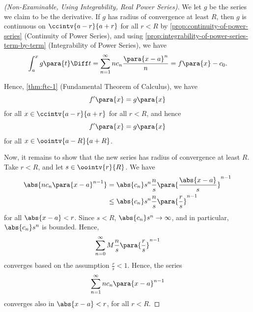 \begin{proof}[(Non-Examinable, Using Integrability, Real Power Series)]
    We let \(g\) be the series we claim to be the derivative. If \(g\) has radius of convergence at least \(R\), then \(g\) is continuous on \(\ccintv{a - r}{a + r}\) for all \(r < R\) by \autoref{prop:continuity-of-power-series} (Continuity of Power Series), and using \autoref{prop:integrability-of-power-series-term-by-term} (Integrability of Power Series), we have
    \[
        \int_{a}^{x} g\para{t} \Diff t = \sum_{n = 1}^{\infty} n c_n \frac{\para{x - a}^{n}}{n} = f\para{x} - c_0.
    \]

    Hence, \autoref{thm:ftc-1} (Fundamental Theorem of Calculus), we have
    \[
        f'\para{x} = g\para{x}
    \]
    for all \(x \in \ccintv{a - r}{a + r}\) for all \(r < R\), and hence
    \[
        f'\para{x} = g\para{x}
    \]
    for all \(x \in \oointv{a - R}{a + R}\).

    Now, it remains to show that the new series has radius of convergence at least \(R\). Take \(r < R\), and let \(s \in \oointv{r}{R}\). We have
    \begin{align*}
        \abs{n c_n \para{x - a}^{n - 1}} &= \abs{c_n} s^n \frac{n}{s} \para{\frac{\abs{x - a}}{s}}^{n - 1} \\
        &\leq \abs{c_n} s^n \frac{n}{s} \para{\frac{r}{s}}^{n - 1}
    \end{align*}
    for all \(\abs{x - a} < r\). Since \(s < R\), \(\abs{c_n} s^n \to \infty\), and in particular, \(\abs{c_n} s^n\) is bounded. Hence,
    \[
        \sum_{n = 0}^{\infty} M \frac{n}{s} \para{\frac{r}{s}}^{n - 1}
    \]
    converges based on the assumption \(\frac{r}{s} < 1\). Hence, the series
    \[
        \sum_{n = 1}^{\infty} n c_n \para{x - a}^{n - 1}
    \]
    converges also in \(\abs{x - a} < r\), for all \(r < R\).
\end{proof}

